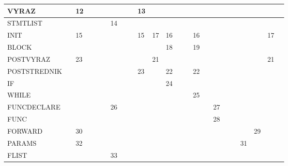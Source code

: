 \documentclass[a4paper]{article}
\begin{document}
\begin{landscape}
\begin{table}[h]
\begin{tabular}{|l|l|l|l|l|l|l|l|l|l|l|l|l|l|l|l|l|l|l|l|l|l|l|}
VYRAZ        &     & 12 &   &     &   &       &      &    & 13   &     &    &      &      &       &    &          &      &   &    &         &      &  \\ \hline
STMTLIST     &     &    &   &     &   & 14    &      &    &      &     &    &      &      &       &    &          &      &   &    &         &      &  \\ \hline
INIT         &     & 15 &   &     &   &       &      &    & 15   & 17  & 16 &      &      & 16    &    &          &      &   &    &         & 17   &  \\ \hline
BLOCK        &     &    &   &     &   &       &      &    &      &     & 18 &      &      & 19    &    &          &      &   &    &         &      &  \\ \hline
POSTVYRAZ    &     & 23 &   &     &   &       &      &    &      & 21  &    &      &      &       &    &          &      &   &    &         & 21   &  \\ \hline
POSTSTREDNIK &     &    &   &     &   &       &      &    & 23   &     & 22 &      &      & 22    &    &          &      &   &    &         &      &  \\ \hline
IF           &     &    &   &     &   &       &      &    &      &     & 24 &      &      &       &    &          &      &   &    &         &      &  \\ \hline
WHILE        &     &    &   &     &   &       &      &    &      &     &    &      &      & 25    &    &          &      &   &    &         &      &  \\ \hline
FUNCDECLARE  &     &    &   &     &   & 26    &      &    &      &     &    &      &      &       &    & 27       &      &   &    &         &      &  \\ \hline
FUNC         &     &    &   &     &   &       &      &    &      &     &    &      &      &       &    & 28       &      &   &    &         &      &  \\ \hline
FORWARD      &     & 30 &   &     &   &       &      &    &      &     &    &      &      &       &    &          &      &   &    & 29      &      &  \\ \hline
PARAMS       &     & 32 &   &     &   &       &      &    &      &     &    &      &      &       &    &          &      &   & 31 &         &      &  \\ \hline
FLIST        &     &    &   &     &   & 33    &      &    &      &     &    &      &      &       &    &          &      &   &    &         &      &  \\ \hline
\end{tabular}
\end{table}
\end{landscape}
\end{document}
